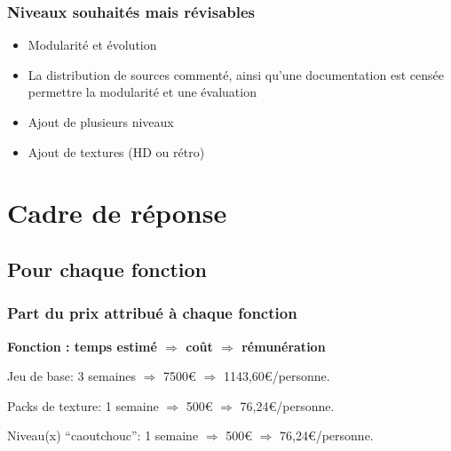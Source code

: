 \documentclass[11pt]{report}
\begin{document}
			\subsection{Niveaux souhaités mais révisables}
			
				\begin{itemize}
				\item Modularité et évolution
				\item La distribution de sources commenté, ainsi qu’une documentation est censée permettre la modularité et une évaluation
				\item Ajout de plusieurs niveaux
				\item Ajout de textures (HD ou rétro)
				\end{itemize}
	
	\chapter{Cadre de réponse}
	\thispagestyle{fancy}
	
		\section{Pour chaque fonction}
		
			
			
			\subsection{Part du prix attribué à chaque fonction}
			
				\textbf{Fonction : temps estimé $\Rightarrow$ coût $\Rightarrow$ rémunération}
				
				Jeu de base: 3 semaines $\Rightarrow$ 7500\euro{} $\Rightarrow$ 1143,60\euro /personne.
				
				Packs de texture: 1 semaine $\Rightarrow$ 500\euro{} $\Rightarrow$ 76,24\euro /personne.
				
				Niveau(x) “caoutchouc”: 1 semaine $\Rightarrow$ 500\euro{} $\Rightarrow$ 76,24\euro /personne.
				
\end{document}
